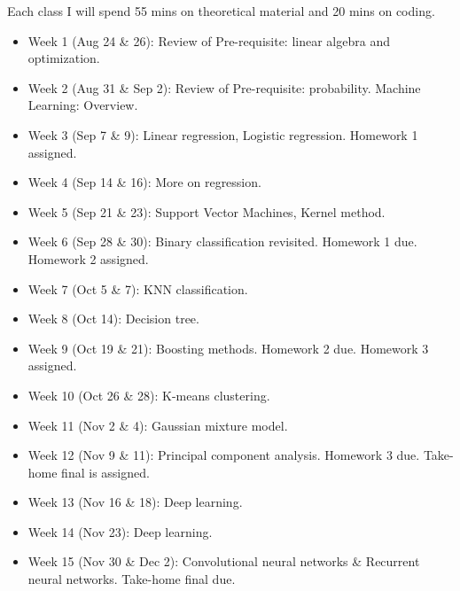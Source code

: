\documentclass[a4paper,10pt]{article}
\begin{document}
Each class I will spend 55 mins on theoretical material and 20 mins on coding.
\begin{itemize}
\item Week 1 (Aug 24 \& 26): Review of Pre-requisite: linear algebra and optimization. 

\item Week 2 (Aug 31 \& Sep 2): Review of Pre-requisite: probability. Machine Learning: Overview.

\item Week 3 (Sep 7 \& 9): Linear regression, Logistic regression. Homework 1 assigned. 

\item Week 4 (Sep 14 \& 16): More on regression.

\item Week 5 (Sep 21 \& 23): Support Vector Machines, Kernel method. 

\item Week 6 (Sep 28 \& 30): Binary classification revisited. Homework 1 due. Homework 2 assigned.  

\item Week 7 (Oct 5 \& 7): KNN classification.  

\item Week 8 (Oct 14): Decision tree.  

\item Week 9 (Oct 19 \& 21): Boosting methods. Homework 2 due. Homework 3 assigned.   

\item Week 10 (Oct 26 \& 28): K-means clustering.

\item Week 11 (Nov 2 \& 4): Gaussian mixture model.

\item Week 12 (Nov 9 \& 11): Principal component analysis.  Homework 3 due. Take-home final is assigned. 

\item Week 13 (Nov 16 \& 18):  Deep learning. 

\item Week 14 (Nov 23): Deep learning. 

\item Week 15 (Nov 30 \& Dec 2): Convolutional neural networks \& Recurrent neural networks. Take-home final due.
 
\end{itemize}
\end{document}
